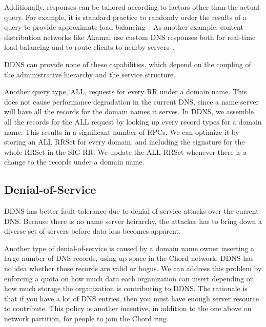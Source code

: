 Additionally, responses can be tailored according to factors
other than the actual query.
For example, it is standard practice to randomly order the results
of a query to provide approximate load balancing~\cite{dns-load:rfc}.
As another example, content distribution networks like Akamai
use custom DNS responses both for real-time load balancing and
to route clients to nearby servers~\cite{akamai.rev.eng}.

DDNS can provide none of these capabilities, which depend
on the coupling of the administrative hierarchy and the service structure.

Another query type, ALL, requests for every RR 
under a domain name. This does not cause performance 
degradation in the current DNS, since a name server
will have all the records for the domain names it serves.
In DDNS, we assemble all the records for the ALL 
request by looking up every record types for a domain 
name. This results in a significant number of RPCs. 
We can optimize it by storing an ALL RRSet for every 
domain, and including the signature for the whole RRSet in
the SIG RR. We update the ALL RRSet whenever there is 
a change to the records under a domain name.

\subsection{Denial-of-Service}

DDNS has better fault-tolerance due to denial-of-service attacks 
over the current DNS. 
Because there is no name server heirarchy, the 
attacker has to bring down a diverse
set of servers before data loss becomes apparent.

Another type of denial-of-service is caused by 
a domain name owner inserting a large number 
of DNS records, using up space in the Chord network.
DDNS has no idea whether those records
are valid or bogus. We can address this problem 
by enforcing a quota on how much data each organization
can insert depending on how much storage the organization
is contributing to DDNS. The rationale is that if you
have a lot of DNS entries, then you must have 
enough server resource to contribute.
This policy is another incentive,
in addition to the one above on network partition,
for people to join the Chord ring.


